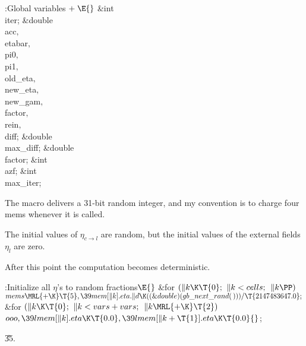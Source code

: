 \B{}:Global variables\X${}\mathrel+\E{}$\6
\&{int} \\{iter};\6
\&{double} \\{acc}${},{}$ \\{etabar}${},{}$ \\{pi0}${},{}$ \\{pi1}${},{}$ %
\\{old\_eta}${},{}$ \\{new\_eta}${},{}$ \\{new\_gam}${},{}$ \\{factor}${},{}$ %
\\{rein}${},{}$ \\{diff};\6
\&{double} \\{max\_diff};\6
\&{double} \\{factor};\6
\&{int} \\{azf};\6
\&{int} \\{max\_iter};\par
\fi

The macro  delivers a 31-bit random integer,
and my convention is to charge four mems whenever it is called.

The initial values of $\eta_{c\to l}$ are random, but the
initial values of the external fields $\eta_l$ are zero.

After this point the computation becomes deterministic.

\Y\B\4:Initialize all $\eta$'s to random fractions\X${}\E{}$\6
\&{for} ${}(\|k\K\T{0};{}$ ${}\|k<\\{cells};{}$ ${}\|k\PP){}$\1\5
${}\\{mems}\MRL{+{\K}}\T{5},\39\\{mem}[\|k].\\{eta}.\|d\K((\&{double})(\\{gb%
\_next\_rand}(\,)))/\T{2147483647.0};{}$\2\6
\&{for} ${}(\|k\K\T{0};{}$ ${}\|k<\\{vars}+\\{vars};{}$ ${}\|k\MRL{+{\K}}%
\T{2}){}$\1\5
${}\\{ooo},\39\\{lmem}[\|k].\\{eta}\K\T{0.0},\39\\{lmem}[\|k+\T{1}].\\{eta}\K%
\T{0.0}{}$;\2\par
\U35.\fi


